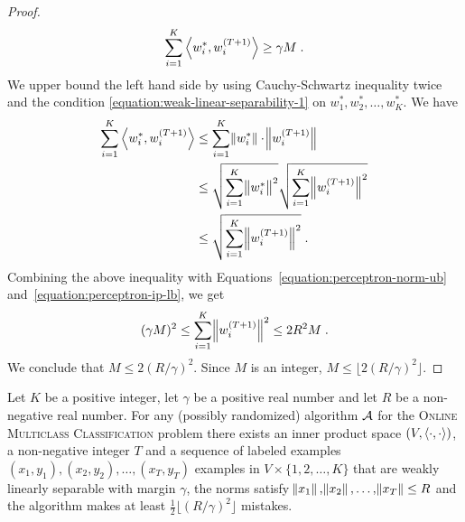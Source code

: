 \begin{proof}
\[
\label{equation:perceptron-ip-lb}
\sum_{i=1}^K \left\langle w_i^*, w_i^{(T+1)} \right\rangle \ge \gamma M \; .
\]
We upper bound the left hand side by using Cauchy-Schwartz inequality twice and
the condition \eqref{equation:weak-linear-separability-1} on $w_1^*, w_2^*, \dots,
w_K^*$. We have
\begin{align*}
\sum_{i=1}^K \left\langle w_i^*, w_i^{(T+1)} \right\rangle
& \le \sum_{i=1}^K \norm{w_i^*} \cdot \norm{w_i^{(T+1)}} \\
& \le \sqrt{\sum_{i=1}^K \norm{w_i^*}^2} \sqrt{\sum_{i=1}^K \norm{w_i^{(T+1)}}^2} \\
& \le \sqrt{\sum_{i=1}^K \norm{w_i^{(T+1)}}^2} \; .
\end{align*}
Combining the above inequality with Equations~\eqref{equation:perceptron-norm-ub}
and~\eqref{equation:perceptron-ip-lb}, we get
$$
(\gamma M)^2 \le \sum_{i=1}^K \norm{w_i^{(T+1)}}^2 \le 2R^2 M \; .
$$
We conclude that $M \le 2(R/\gamma)^2$. Since $M$ is an integer, $M \le \lfloor 2(R/\gamma)^2 \rfloor$.
\end{proof}


\begin{theorem}
\label{theorem:online-multiclass-classification-mistake-lower-bound}
Let $K$ be a positive integer, let $\gamma$ be a positive real number and let
$R$ be a non-negative real number. For any (possibly randomized) algorithm
$\mathcal{A}$ for the \textsc{Online Multiclass Classification} problem there exists
an inner product space $(V, \left\langle \cdot, \cdot \right\rangle)$, a non-negative integer $T$ and
a sequence of labeled examples $(x_1, y_1), (x_2, y_2), \dots, (x_T, y_T)$
examples in $V \times \{1,2,\dots,K\}$ that are weakly linearly separable with
margin $\gamma$, the norms satisfy $\norm{x_1}, \norm{x_2}, \dots, \norm{x_T}
\le R$ and the algorithm makes at least $\frac 1 2 \lfloor (R/\gamma)^2 \rfloor$
mistakes.
\end{theorem}

